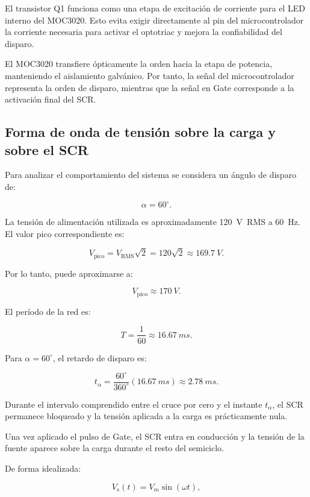 \documentclass[12pt]{article}
\begin{document}
El transistor Q1 funciona como una etapa de excitación de corriente para el
LED interno del MOC3020. Esto evita exigir directamente al pin del
microcontrolador la corriente necesaria para activar el optotriac y mejora
la confiabilidad del disparo.

El MOC3020 transfiere ópticamente la orden hacia la etapa de potencia,
manteniendo el aislamiento galvánico. Por tanto, la señal del
microcontrolador representa la orden de disparo, mientras que la señal en
Gate corresponde a la activación final del SCR.

\subsection{Forma de onda de tensión sobre la carga y sobre el SCR}

Para analizar el comportamiento del sistema se considera un ángulo de
disparo de:

\[
\alpha=60^\circ.
\]

La tensión de alimentación utilizada es aproximadamente
\SI{120}{V RMS} a \SI{60}{Hz}. El valor pico correspondiente es:

\begin{equation}
V_{\mathrm{pico}}
=
V_{\mathrm{RMS}}\sqrt{2}
=
120\sqrt{2}
\approx
\SI{169.7}{V}.
\end{equation}

Por lo tanto, puede aproximarse a:

\[
V_{\mathrm{pico}}\approx\SI{170}{V}.
\]

El período de la red es:

\[
T=\frac{1}{60}
\approx\SI{16.67}{ms}.
\]

Para $\alpha=60^\circ$, el retardo de disparo es:

\[
t_\alpha
=
\frac{60^\circ}{360^\circ}
\left(\SI{16.67}{ms}\right)
\approx
\SI{2.78}{ms}.
\]

Durante el intervalo comprendido entre el cruce por cero y el instante
$t_\alpha$, el SCR permanece bloqueado y la tensión aplicada a la carga es
prácticamente nula.

Una vez aplicado el pulso de Gate, el SCR entra en conducción y la tensión
de la fuente aparece sobre la carga durante el resto del semiciclo.

De forma idealizada:

\begin{equation}
V_s(t)=V_m\sin(\omega t),
\end{equation}
\end{document}

